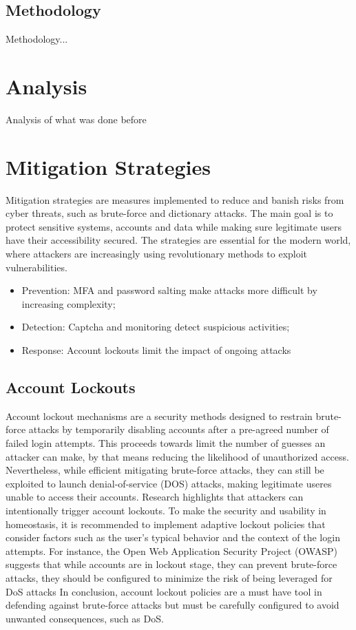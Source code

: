 \documentclass{comjnl}
\begin{document}
\subsection{Methodology}

Methodology...


\section{Analysis}

Analysis of what was done before

\section{Mitigation Strategies}
Mitigation strategies are measures implemented to reduce and banish risks from cyber threats, such as brute-force and dictionary attacks. The main goal is to protect sensitive systems, accounts and data while making sure legitimate users have their accessibility secured. The strategies are essential for the modern world, where attackers are increasingly using revolutionary methods to exploit vulnerabilities.


\begin{itemize}
  \item Prevention: MFA and password salting make attacks more difficult by increasing complexity;
  \item Detection: Captcha and monitoring detect suspicious activities;
  \item Response: Account lockouts limit the impact of ongoing attacks
\end{itemize}

\subsection{Account Lockouts}
Account lockout mechanisms are a security methods designed to restrain brute-force attacks by temporarily disabling accounts after a pre-agreed number of failed login attempts. This proceeds towards limit the number of guesses an attacker can make, by that means reducing the likelihood of unauthorized access. Nevertheless, while efficient mitigating brute-force attacks, they can still be exploited to launch denial-of-service (DOS) attacks, making legitimate useres unable to access their accounts. Research highlights that attackers can intentionally trigger account lockouts.\cite{account_lockout_dos} To make the security and usability in homeostasis, it is recommended to implement adaptive lockout policies that consider factors such as the user's typical behavior and the context of the login attempts. For instance, the Open Web Application Security Project (OWASP) suggests that while accounts are in lockout stage, they can prevent brute-force attacks, they should be configured to minimize the risk of being leveraged for DoS attacks \cite{blocking_brute_force} In conclusion, account lockout policies are a must have tool in defending against brute-force attacks but must be carefully configured to avoid unwanted consequences, such as DoS.
\end{document}
